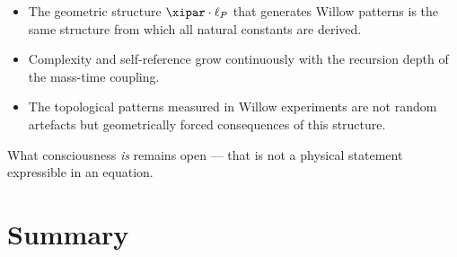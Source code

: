 \begin{conclusionBox}
\begin{itemize}
    \item The geometric structure $\xipar \cdot \ell_P$ that generates Willow patterns
    is the same structure from which all natural constants are derived.
    \item Complexity and self-reference grow continuously with the recursion depth of
    the mass-time coupling.
    \item The topological patterns measured in Willow experiments are not random
    artefacts but geometrically forced consequences of this structure.
\end{itemize}
What consciousness \textit{is} remains open — that is not a physical statement
expressible in an equation.
\end{conclusionBox}


\section{Summary}

\begin{table}[ht]
\centering
{}
\caption{Three Willow breakthroughs and their FFGFT interpretation}
\end{table}

